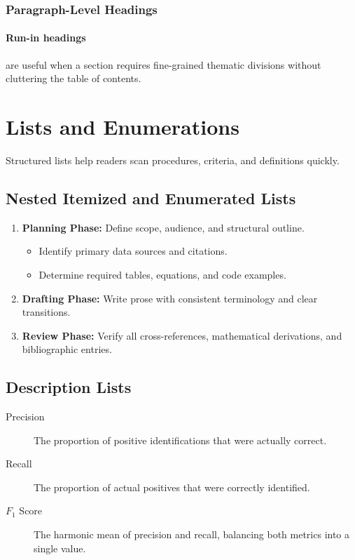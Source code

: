 \documentclass[11pt, a4paper]{article}
\theoremstyle{plain}
\theoremstyle{definition}
\theoremstyle{remark}
\begin{document}
\subsubsection{Paragraph-Level Headings}
\paragraph{Run-in headings} are useful when a section requires fine-grained thematic divisions without cluttering the table of contents.

\section{Lists and Enumerations}
\label{sec:lists}

Structured lists help readers scan procedures, criteria, and definitions quickly.

\subsection{Nested Itemized and Enumerated Lists}

\begin{enumerate}
  \item \textbf{Planning Phase:} Define scope, audience, and structural outline.
  \begin{itemize}
    \item Identify primary data sources and citations.
    \item Determine required tables, equations, and code examples.
  \end{itemize}
  \item \textbf{Drafting Phase:} Write prose with consistent terminology and clear transitions.
  \item \textbf{Review Phase:} Verify all cross-references, mathematical derivations, and bibliographic entries.
\end{enumerate}

\subsection{Description Lists}

\begin{description}
  \item[Precision] The proportion of positive identifications that were actually correct.
  \item[Recall] The proportion of actual positives that were correctly identified.
  \item[$F_1$ Score] The harmonic mean of precision and recall, balancing both metrics into a single value.
\end{description}
\end{document}
